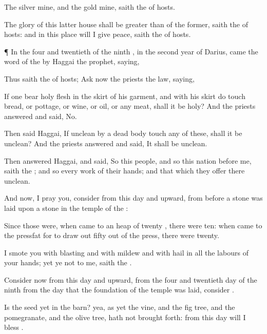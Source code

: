 {The
silver
{} mine, and the
gold
{} mine,
saith the
{} of
hosts.

The
glory of this
latter
house shall be greater
than of the
former,
saith the
{} of
hosts: and in this
place will I
give
peace,
saith the
{} of
hosts.


\par }{\PP {}¶ In the
four and
twentieth
{} of the
ninth
{}, in the
second
year of
Darius, came the
word of the
{}
by
Haggai the
prophet,
saying,

Thus
saith the
{} of
hosts;
Ask now the
priests
{} the
law,
saying,

If
one
bear
holy
flesh in the
skirt of his
garment, and with his
skirt do
touch
bread, or
pottage, or
wine, or
oil, or any
meat, shall it be
holy? And the
priests
answered and
said, No.

Then
said
Haggai, If
{}
unclean by a dead
body
touch any of these, shall it be
unclean? And the
priests
answered and
said, It shall be
unclean.

Then
answered
Haggai, and
said, So
{} this
people, and so
{} this
nation
before me,
saith the
{}; and so
{} every
work of their
hands; and that which they
offer there
{}
unclean.

And now, I pray you,
consider from this
day and
upward, from
before a
stone was
laid upon a
stone in the
temple of the
{}:

Since those
{} were, when
{}
came to an
heap of
twenty
{}, there were
{}
ten: when
{}
came to the
pressfat for to draw
out
fifty
{} out of the
press, there were
{}
twenty.

I
smote you with
blasting and with
mildew and with
hail in all the
labours of your
hands; yet ye
{} not to me,
saith the
{}.

Consider now from this
day and
upward, from the
four and
twentieth
day of the
ninth
{} from the
day that the
foundation of the
{}
temple was laid,
consider
{}.

Is the
seed yet in the
barn? yea, as yet the
vine, and the fig
tree, and the
pomegranate, and the
olive
tree, hath not brought
forth: from this
day will I
bless
{}.


}
